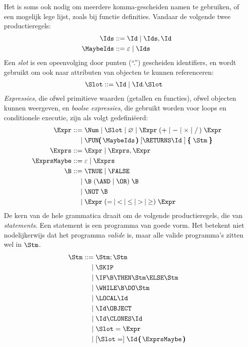 Het is soms ook nodig om meerdere komma-gescheiden namen te gebruiken, of een mogelijk lege lijst, zoals bij functie definities. Vandaar de volgende twee productieregels:
\begin{align*}
  \Ids \GrammarDef \Id \mid \Ids, \Id \\
  \MaybeIds \GrammarDef \varepsilon \mid \Ids
\end{align*}
Een \emph{slot}%
is een opeenvolging door punten (``.'') gescheiden identifiers,%
en wordt gebruikt om ook naar attributen van objecten te kunnen referenceren:%
\begin{align*}
  \Slot \GrammarDef \Id \mid \Id . \Slot
\end{align*}
\emph{Expressies}, die ofwel primitieve waarden (getallen en functies), ofwel objecten kunnen weergeven, en \emph{boolse expressies}, die gebruikt worden voor loops en conditionele executie, zijn als volgt gedefiniëerd:%
\begin{align*}
  \Expr \GrammarDef \Num \mid \Slot \mid \varnothing \mid \Expr\; (+ \mid - \mid \times \mid /\,)\; \Expr \\
  \GrammarOr \FUN\pmb{(}\,\MaybeIds\,\pmb{)}\; \GrammarOpt{\RETURNS \Id\;} \pmb{\{}\; \Stm\; \pmb{\}} \\
  \Exprs \GrammarDef \Expr \mid \Exprs, \Expr \\
  \ExprsMaybe \GrammarDef \varepsilon \mid \Exprs \\
  \B \GrammarDef \TRUE \mid \FALSE \\
  \GrammarOr \B\; (\AND \mid \OR)\; \B \\
  \GrammarOr \NOT\; \B \\
  \GrammarOr \Expr\; (=\: \mid\: <\: \mid\: \le\: \mid\: >\: \mid\: \ge)\; \Expr
\end{align*}
De kern van de hele grammatica draait om de volgende productieregels, die van \emph{statements}. Een statement is een programma van goede vorm. Het betekent niet nodelijkerwijs%
dat het programma \emph{valide} is, maar alle valide programma's zitten wel in $\Stm$.
\begin{align*}
  \Stm \GrammarDef \Stm; \Stm \\
  \GrammarOr \SKIP \\
  \GrammarOr \IF \B \THEN \Stm \ELSE \Stm \\
  \GrammarOr \WHILE \B \DO \Stm \\
  \GrammarOr \LOCAL \Id \\
  \GrammarOr \Id \OBJECT \\
  \GrammarOr \Id \CLONES \Id \\
  \GrammarOr \Slot = \Expr \\
  \GrammarOr \GrammarOpt{\Slot =} \Id\,\pmb{(}\,\ExprsMaybe\,\pmb{)} \\
\end{align*}
